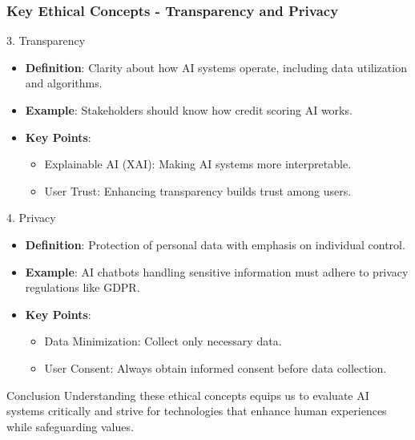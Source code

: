 \documentclass[aspectratio=169]{beamer}
\begin{document}
\begin{frame}[fragile]
    \frametitle{Key Ethical Concepts - Transparency and Privacy}
    \begin{block}{3. Transparency}
        \begin{itemize}
            \item \textbf{Definition}: Clarity about how AI systems operate, including data utilization and algorithms.
            \item \textbf{Example}: Stakeholders should know how credit scoring AI works.
            \item \textbf{Key Points}:
            \begin{itemize}
                \item Explainable AI (XAI): Making AI systems more interpretable.
                \item User Trust: Enhancing transparency builds trust among users.
            \end{itemize}
        \end{itemize}
    \end{block}

    \begin{block}{4. Privacy}
        \begin{itemize}
            \item \textbf{Definition}: Protection of personal data with emphasis on individual control.
            \item \textbf{Example}: AI chatbots handling sensitive information must adhere to privacy regulations like GDPR.
            \item \textbf{Key Points}:
            \begin{itemize}
                \item Data Minimization: Collect only necessary data.
                \item User Consent: Always obtain informed consent before data collection.
            \end{itemize}
        \end{itemize}
    \end{block}
    
    \begin{block}{Conclusion}
        Understanding these ethical concepts equips us to evaluate AI systems critically and strive for technologies that enhance human experiences while safeguarding values.
    \end{block}
\end{frame}
\end{document}
